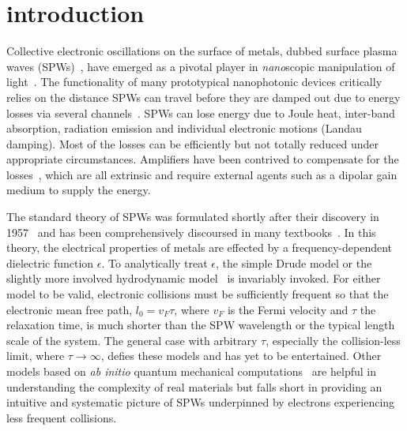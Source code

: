 \documentclass[aps,reprint]{revtex4-1}
\begin{document}
\maketitle %

\section{introduction}
\label{sec:1}
Collective electronic oscillations on the surface of metals,
dubbed surface plasma waves (SPWs)~\cite{ritchie1957,ferrell1958,raether1988}, have emerged as a pivotal player in \textit{nano}scopic manipulation of light~\cite{benno1988,zayats2005,maier2007,ozbay2006,mark2007}. The functionality of many prototypical nanophotonic devices critically relies on the distance SPWs can travel before they are damped out due to energy losses via several channels~\cite{ozbay2006,mark2007,barnes2003,barnes2006,ebbesen2008,martino2012}. SPWs can lose energy due to Joule heat, inter-band absorption, radiation emission and individual electronic motions (Landau damping). Most of the losses can be efficiently but not totally reduced under appropriate circumstances. Amplifiers have been contrived to compensate for the losses~\cite{bergman2003,seidel2005,leon2008,leon2010,yu2011,pierre2012,fedyanin2012,cohen2013,aryal2015}, which are all extrinsic and require external agents such as a dipolar gain medium to supply the energy. 

The standard theory of SPWs was formulated shortly after their discovery in 1957~\cite{ritchie1957} and has been comprehensively discoursed in many textbooks~\cite{raether1988,zayats2005,maier2007,pitarke2007,sarid2010}. In this theory, the electrical properties of metals are effected by a frequency-dependent dielectric function $\epsilon$. To analytically treat $\epsilon$, the simple Drude model or the slightly more involved hydrodynamic model~\cite{pitarke2007,harris1971,fetter,schnitzer2016} is invariably invoked. For either model to be valid, electronic collisions must be sufficiently frequent so that the electronic mean free path, $l_0=v_F\tau$, where $v_F$ is the Fermi velocity and $\tau$ the relaxation time, is much shorter than the SPW wavelength or the typical length scale of the system. The general case with arbitrary $\tau$, especially the collision-less limit, where $\tau\rightarrow\infty$, defies these models and has yet to be entertained. Other models based on \textit{ab initio} quantum mechanical computations~\cite{pitarke2007,peter1984} are helpful in understanding the complexity of real materials but falls short in providing an intuitive and systematic picture of SPWs underpinned by electrons experiencing less frequent collisions. 
\end{document}
